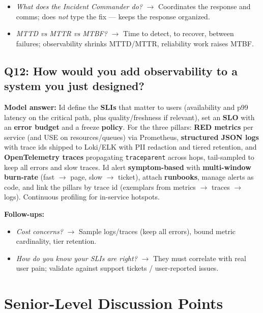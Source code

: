 \documentclass[11pt]{article}
\providecommand{\tightlist}{\setlength{\itemsep}{1pt}\setlength{\parskip}{0pt}}
\begin{document}
\begin{itemize}
\tightlist
\item
  \emph{What does the Incident Commander do?} \(\rightarrow\) Coordinates the response and comms; does \emph{not} type the fix --- keeps the response organized.
\item
  \emph{MTTD vs MTTR vs MTBF?} \(\rightarrow\) Time to detect, to recover, between failures; observability shrinks MTTD/MTTR, reliability work raises MTBF.
\end{itemize}

\subsection{Q12: How would you add observability to a system you just designed?}\label{q12-how-would-you-add-observability-to-a-system-you-just-designed}

\textbf{Model answer:} I\textquotesingle d define the \textbf{SLIs} that matter to users (availability and p99 latency on the critical path, plus quality/freshness if relevant), set an \textbf{SLO} with an \textbf{error budget} and a freeze \textbf{policy}. For the three pillars: \textbf{RED metrics} per service (and USE on resources/queues) via Prometheus, \textbf{structured JSON logs} with trace ids shipped to Loki/ELK with PII redaction and tiered retention, and \textbf{OpenTelemetry traces} propagating \texttt{traceparent} across hops, tail-sampled to keep all errors and slow traces. I\textquotesingle d alert \textbf{symptom-based} with \textbf{multi-window burn-rate} (fast \(\rightarrow\) page, slow \(\rightarrow\) ticket), attach \textbf{runbooks}, manage alerts as code, and link the pillars by trace id (exemplars from metrics \(\rightarrow\) traces \(\rightarrow\) logs). Continuous profiling for in-service hotspots.

\textbf{Follow-ups:}

\begin{itemize}
\tightlist
\item
  \emph{Cost concerns?} \(\rightarrow\) Sample logs/traces (keep all errors), bound metric cardinality, tier retention.
\item
  \emph{How do you know your SLIs are right?} \(\rightarrow\) They must correlate with real user pain; validate against support tickets / user-reported issues.
\end{itemize}

\section{Senior-Level Discussion Points}\label{senior-level-discussion-points}
\end{document}
